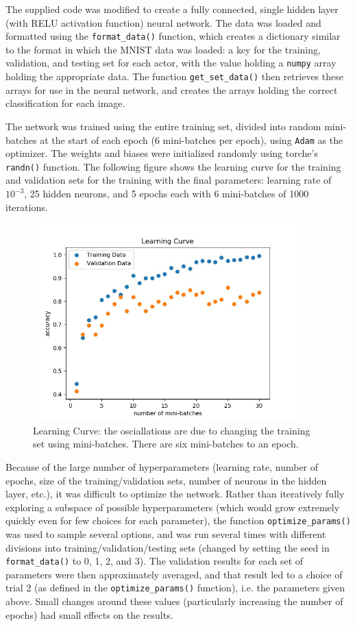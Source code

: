 \documentclass{article}
\begin{document}
   The supplied code was modified to create a fully connected, single hidden layer (with RELU
   activation function) neural network. The data was loaded and formatted using the \texttt{format\_data()}
   function, which creates a dictionary similar to the format in which the MNIST data was loaded:
   a key for the training, validation, and testing set for each actor, with the value holding a
   \texttt{numpy} array holding the appropriate data.
   The function \texttt{get\_set\_data()} then retrieves these arrays for use in the neural network,
   and creates the arrays holding the correct classification for each image.

   The network was trained using the entire training set, divided into random mini-batches at the
   start of each epoch (6 mini-batches per epoch), using \texttt{Adam} as the optimizer.
   The weights and biases were initialized randomly using torche's \texttt{randn()} function.
   The following figure shows the learning curve for the training and validation sets for the training
   with the final parameters: learning rate of $10^{-3}$, 25 hidden neurons, and 5 epochs each with 6 mini-batches
   of 1000 iterations.
      \begin{figure}[h] \centering
         \includegraphics[width=4in]{resources/part8}
         \caption{Learning Curve: the osciallations are due to changing the training set
                  using mini-batches. There are six mini-batches to an epoch.}
       \end{figure}

   Because of the large number of hyperparameters (learning rate, number of epochs, size of the
   training/validation sets, number of neurons in the hidden layer, etc.), it was difficult to
   optimize the network.
   Rather than iteratively fully exploring a subspace of possible hyperparameters (which would grow
   extremely quickly even for few choices for each parameter), the function \texttt{optimize\_params()}
   was used to sample several options, and was run several times with different divisions into
   training/validation/testing sets (changed by setting the seed in \texttt{format\_data()} to 0, 1, 2, and 3).
   The validation results for each set of parameters were then approximately averaged, and that result
   led to a choice of trial 2 (as defined in the \texttt{optimize\_params()} function), i.e. the parameters
   given above. Small changes around these values (particularly increasing the number of epochs)
   had small effects on the results.
\end{document}
